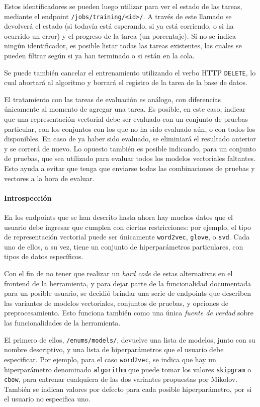 Estos identificadores se pueden luego utilizar para ver el estado de las tareas, mediante el
endpoint \texttt{/jobs/training/<id>/}. A través de este llamado se devolverá el estado (si todavía
está esperando, si ya está corriendo, o si ha ocurrido un error) y el progreso de la tarea (un
porcentaje). Si no se indica ningún identificador, es posible listar todas las tareas existentes,
las cuales se pueden filtrar según si ya han terminado o si están en la cola.

Se puede también cancelar el entrenamiento utilizando el verbo HTTP \texttt{DELETE}, lo cual
abortará al algoritmo y borrará el registro de la tarea de la base de datos.

El tratamiento con las tareas de evaluación es análogo, con diferencias únicamente al momento de
agregar una tarea. Es posible, en este caso, indicar que una representación vectorial debe ser
evaluado con un conjunto de pruebas particular, con los conjuntos con los que no ha sido evaluado
aún, o con todos los disponibles. En caso de ya haber sido evaluado, se eliminiará el resultado
anterior y se correrá de nuevo. Lo opuesto también es posible indicando, para un conjunto de
pruebas, que sea utilizado para evaluar todos los modelos vectoriales faltantes. Esto ayuda a evitar
que tenga que enviarse todas las combinaciones de pruebas y vectores a la hora de evaluar.


\paragraph{Introspección}

En los endpoints que se han descrito hasta ahora hay muchos datos que el usuario debe ingresar que
cumplen con ciertas restricciones: por ejemplo, el tipo de representación vectorial puede ser
únicamente \texttt{word2vec}, \texttt{glove}, o \texttt{svd}. Cada uno de ellos, a su vez, tiene un
conjunto de hiperparámetros particulares, con tipos de datos específicos.

Con el fin de no tener que realizar un \textit{hard code} de estas alternativas en el frontend de la
herramienta, y para dejar parte de la funcionalidad documentada para un posible usuario, se decidió
brindar una serie de endpoints que describen las variantes de modelos vectoriales, conjuntos de
pruebas, y opciones de preprocesamiento. Esto funciona también como una única \textit{fuente de
verdad} sobre las funcionalidades de la herramienta.

El primero de ellos, \texttt{/enums/models/}, devuelve una lista de modelos, junto con su nombre
descriptivo, y una lista de hiperparámetros que el usuario debe especificar. Por ejemplo, para el
caso \texttt{word2vec}, se indica que hay un hiperparámetro denominado \texttt{algorithm} que puede
tomar los valores \texttt{skipgram} o \texttt{cbow}, para entrenar cualquiera de las dos variantes
propuestas por Mikolov. También se indican valores por defecto para cada posible hiperparámetro, por
si el usuario no especifica uno.

